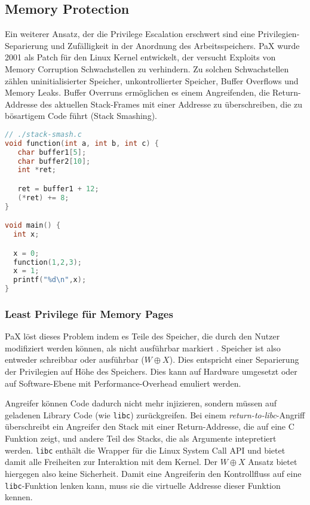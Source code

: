 \subsection{Memory Protection}

Ein weiterer Ansatz, der die Privilege Escalation erschwert sind eine Privilegien-Separierung und Zufälligkeit in der Anordnung des Arbeitsspeichers. PaX wurde 2001 als Patch für den Linux Kernel entwickelt, der versucht Exploits von Memory Corruption Schwachstellen zu verhindern. Zu solchen Schwachstellen zählen uninitialisierter Speicher, unkontrollierter Speicher, Buffer Overflows und Memory Leaks. 
Buffer Overruns ermöglichen es einem Angreifenden, die Return-Addresse des aktuellen Stack-Frames mit einer Addresse zu überschreiben, die zu bösartigem Code führt (Stack Smashing). 

\begin{lstlisting}[language=c,caption={Stack Smashing, das ein Überspringen der \texttt{x = 1} Instruktion bewirkt. Aus \cite{alpeh1996smashing}}]
// ./stack-smash.c
void function(int a, int b, int c) {
   char buffer1[5];
   char buffer2[10];
   int *ret;

   ret = buffer1 + 12;
   (*ret) += 8;
}

void main() {
  int x;

  x = 0;
  function(1,2,3);
  x = 1;
  printf("%d\n",x);
}
\end{lstlisting}


\subsubsection{Least Privilege für Memory Pages}
\label{sec:mem-sec}

PaX löst dieses Problem indem es Teile des Speicher, die durch den Nutzer modifiziert werden können, als nicht ausführbar markiert \cite{schacham_2004}. Speicher ist also entweder schreibbar oder ausführbar ($W \oplus X$). Dies entspricht einer Separierung der Privilegien auf Höhe des Speichers. Dies kann auf Hardware umgesetzt oder auf Software-Ebene mit Performance-Overhead emuliert werden.

Angreifer können Code dadurch nicht mehr injizieren, sondern müssen auf geladenen Library Code (wie \texttt{libc}) zurückgreifen. Bei einem \textit{return-to-libc}-Angriff überschreibt ein Angreifer den Stack mit einer Return-Addresse, die auf eine C Funktion zeigt, und andere Teil des Stacks, die als Argumente intepretiert werden. \texttt{libc} enthält die Wrapper für die Linux System Call API und bietet damit alle Freiheiten zur Interaktion mit dem Kernel. Der $W \oplus X$ Ansatz bietet hiergegen also keine Sicherheit. Damit eine Angreiferin den Kontrollfluss auf eine \texttt{libc}-Funktion lenken kann, muss sie die virtuelle Addresse dieser Funktion kennen.

